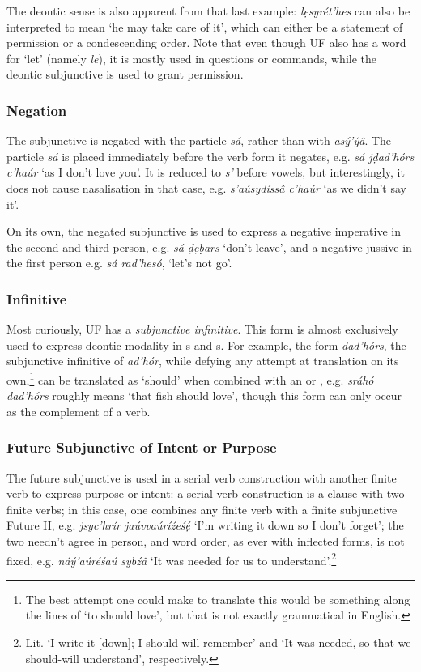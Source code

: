 \documentclass[a4paper, 12pt, twoside, final]{article}
\let \w \textit
\begin{document}
The deontic sense is also apparent from that last example: \w{lẹsyrét’hes} can also be interpreted to mean ‘he
may take care of it’, which can either be a statement of permission or a condescending order. Note that even
though UF also has a word for ‘let’ (namely \w{le}), it is mostly used in questions or commands, while the
deontic subjunctive is used to grant permission.

\subsubsection{Negation}\label{subsubsec:negated-subjunctive}
The subjunctive is negated with the particle \w{sá}, rather than with \w{asý’ýâ}. The particle \w{sá} is placed
immediately before the verb form it negates, e.g. \w{sá jḍad’hórs c’haúr} ‘as I don’t love you’. It is reduced
to \w{s’} before vowels, but interestingly, it does not cause nasalisation in that case, e.g. \w{s’aúsydíssâ c’haúr}
‘as we didn’t say it’.

On its own, the negated subjunctive is used to express a negative imperative in the second and third person,
e.g. \w{sá ḍẹḅars} ‘don’t leave’, and a negative jussive in the first person e.g. \w{sá rad’hesó}, ‘let’s not go’.

\subsubsection{Infinitive}
Most curiously, UF has a \textit{subjunctive infinitive}. This form is almost exclusively used to express deontic modality
in s and s. For example, the form \w{dad’hórs}, the subjunctive infinitive of \w{ad’hór}, while defying any attempt
at translation on its own,\footnote{The best attempt one could make to translate this would be something along the
lines of ‘to should love’, but that is not exactly grammatical in English.} can be translated as ‘should’ when combined
with an  or , e.g. \w{sráhó dad’hórs} roughly means ‘that fish should love’, though this form can only
occur as the complement of a verb.

\subsubsection{Future Subjunctive of Intent or Purpose}
The future subjunctive is used in a serial verb construction with another finite verb to express purpose or intent: a
serial verb construction is a clause with two finite verbs; in this case, one combines any finite verb with
a finite subjunctive Future II, e.g. \w{jsyc’hrír jaúvvaúríźeśẹ́} ‘I’m writing
it down so I don’t forget’; the two needn’t agree in person, and word order, as ever with inflected forms, is not fixed,
e.g. \w{náý’aúréśaú sybźâ} ‘It was needed
for us to understand’.\footnote{Lit. ‘I write it [down]; I should-will remember’ and ‘It was needed, so that we
should-will understand’, respectively.}
\end{document}
